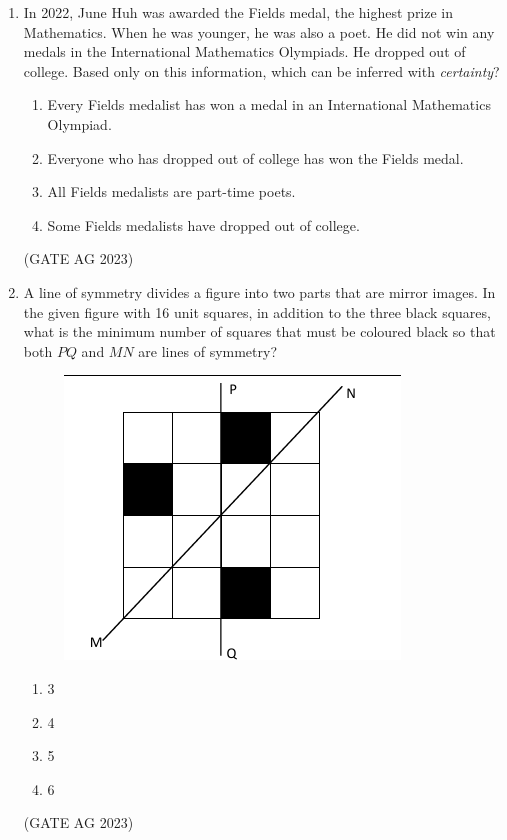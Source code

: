 \documentclass[journal,12pt,onecolumn]{IEEEtran}
\theoremstyle{remark}
\begin{document}
\begin{enumerate}
\item In 2022, June Huh was awarded the Fields medal, the highest prize in Mathematics. When he was younger, he was also a poet. He did not win any medals in the International Mathematics Olympiads. He dropped out of college. 
Based only on this information, which can be inferred with \emph{certainty}?
\begin{enumerate}
    \item Every Fields medalist has won a medal in an International Mathematics Olympiad.
    \item Everyone who has dropped out of college has won the Fields medal.
    \item All Fields medalists are part-time poets.
    \item Some Fields medalists have dropped out of college.
\end{enumerate}
\hfill{(GATE AG 2023)}

\item A line of symmetry divides a figure into two parts that are mirror images. In the given figure with 16 unit squares, in addition to the three black squares, what is the minimum number of squares that must be coloured black so that both $PQ$ and $MN$ are lines of symmetry?
\begin{figure}[H]
    \centering
    \includegraphics[]{figs/Q.5.png}
    \caption{}
    \label{fig:2}
\end{figure}
\begin{multicols}{4}
\begin{enumerate}
    \item 3
    \item 4
    \item 5
    \item 6
\end{enumerate}
\end{multicols}
\hfill{(GATE AG 2023)}


\end{enumerate}
\end{document}
